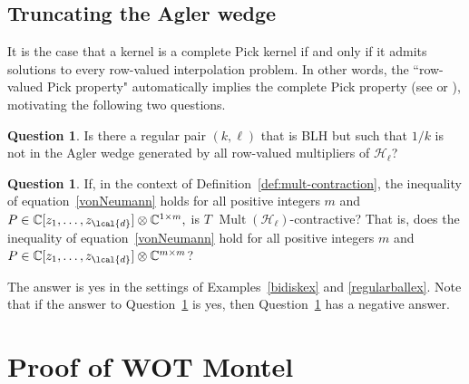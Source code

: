 \documentclass[a4paper,reqno,index]{amsart}
\numberwithin{equation}{section}
\newcommand{\CC}{\mathbb{C}}
\newcommand{\Mult}{\operatorname{Mult}}
\newcommand{\cH}{\mathcal{H}}
\theoremstyle{definition}
\newtheorem{question}[theorem]{Question}
\begin{document}
 
\subsection{Truncating the Agler wedge}
It is the case that a kernel is a complete Pick kernel if and only if it admits solutions to every row-valued interpolation problem. In other words, the ``row-valued Pick property" automatically implies the complete Pick property (see  \cite{Pickbook} or \cite{Gregsimple}),  motivating
the following two questions.



\begin{question}
 \label{q:not-row}
Is there a regular pair $(k, \ell)$ that is BLH but such that $1/k$ is not in the Agler wedge generated by all row-valued multipliers of $\mathcal{H}_{\ell}$? 
\end{question}
\begin{question} \label{q:not-row-strong}
     If,  in the 
context of Definition~\ref{def:mult-contraction},
the inequality of equation~\eqref{vonNeumann} holds
 for all positive integers $m$ and $P\in \CC[z_1, \dots, z_{\lcal{d}}]\otimes \CC^{1\times m},$  is $T$ $\Mult(\cH_\ell)$-contractive? That is, does the inequality of equation~\eqref{vonNeumann} hold for all positive integers $m$ and $P\in \CC[z_1, \dots, z_{\lcal{d}}]\otimes \CC^{m\times m}$? 
\end{question}
\noindent The answer is yes  in the settings of
 Examples~\ref{bidiskex} and \ref{regularballex}. Note that if the answer to Question~\ref{q:not-row-strong} is yes, then Question~\ref{q:not-row} has a negative answer.
 
 
 

\printbibliography
\appendix 
\section{ Proof of WOT Montel} \label{appendMontel}
\end{document}
